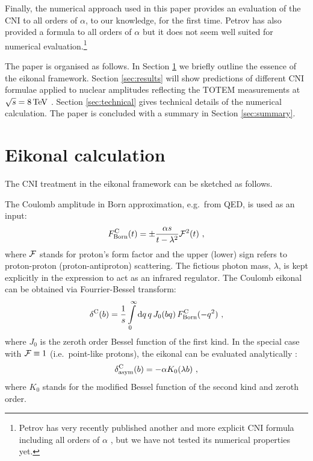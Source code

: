 \documentclass[pdftex,twocolumn,epjc3]{svjour3}
\def\d{{\rm d}}
\def\un#1{\,{\rm #1}}
\begin{document}
Finally, the numerical approach used in this paper provides an evaluation of the CNI to all orders of $\alpha$, to our knowledge, for the first time. Petrov has also provided a formula to all orders of $\alpha$ \cite{petrov2018} but it does not seem well suited for numerical evaluation.\footnote{
Petrov has very recently published another and more explicit CNI formula including all orders of $\alpha$ \cite{petrov2020}, but we have not tested its numerical properties yet.
}

The paper is organised as follows. In Section \ref{sec:eikonal} we briefly outline the essence of the eikonal framework. Section \ref{sec:results} will show predictions of different CNI formulae applied to nuclear amplitudes reflecting the TOTEM measurements at $\sqrt s = 8\un{TeV}$ \cite{totem-8tev-1km}. Section \ref{sec:technical} gives technical details of the numerical calculation. The paper is concluded with a summary in Section \ref{sec:summary}.




\section{Eikonal calculation}
\label{sec:eikonal}

The CNI treatment in the eikonal framework can be sketched as follows.

The Coulomb amplitude in Born approximation, e.g.~from QED, is used as an input:
\begin{equation}
F^{\rm C}_{\rm Born}(t) = \pm {\alpha s\over t - \lambda^2} {\cal F}^2(t)\ ,
\label{eq:F C Born}
\end{equation}
where ${\cal F}$ stands for proton's form factor and the upper (lower) sign refers to proton-proton (proton-antiproton) scattering. The fictious photon mass, $\lambda$, is kept explicitly in the expression to act as an infrared regulator. The Coulomb eikonal can be obtained via Fourrier-Bessel transform:
\begin{equation}
\delta^{\rm C}(b) = {1\over s} \int\limits_0^\infty \d q\, q\, J_0(bq)\, F^{\rm C}_{\rm Born}(-q^2)\ ,
\label{eq:de C}
\end{equation}
where $J_0$ is the zeroth order Bessel function of the first kind. In the special case with ${\cal F} \equiv 1$ (i.e.~point-like protons), the eikonal can be evaluated analytically \cite{cahn82}:
\begin{equation}
\delta^{\rm C}_{\rm asym}(b) = -\alpha K_0(\lambda b)\ ,
\label{eq:de C asym}
\end{equation}
where $K_0$ stands for the modified Bessel function of the second kind and zeroth order.
\end{document}
